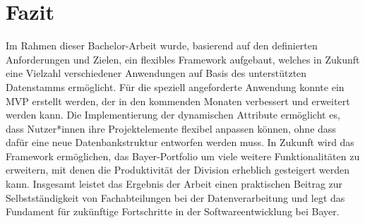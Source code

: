 \section{Fazit}
Im Rahmen dieser Bachelor-Arbeit wurde, basierend auf den definierten Anforderungen und Zielen, ein flexibles Framework aufgebaut, welches in Zukunft 
eine Vielzahl verschiedener Anwendungen auf Basis des unterstützten Datenstamms ermöglicht. Für die speziell angeforderte Anwendung konnte ein MVP erstellt werden, 
der in den kommenden Monaten verbessert und erweitert werden kann. Die Implementierung der dynamischen Attribute ermöglicht es,
dass Nutzer*innen ihre Projektelemente flexibel anpassen können, ohne dass dafür eine neue Datenbankstruktur entworfen werden muss. In Zukunft wird das Framework 
ermöglichen, das Bayer-Portfolio um viele weitere Funktionalitäten zu erweitern, mit denen die Produktivität der Division erheblich gesteigert werden kann. Insgesamt
leistet das Ergebnis der Arbeit einen praktischen Beitrag zur Selbstständigkeit von Fachabteilungen bei der Datenverarbeitung und legt das Fundament für zukünftige 
Fortschritte in der Softwareentwicklung bei Bayer.